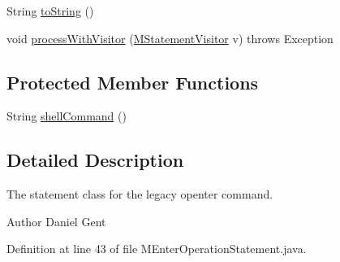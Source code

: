 \begin{DoxyCompactItemize}
\item 
String \hyperlink{classorg_1_1tzi_1_1use_1_1uml_1_1sys_1_1soil_1_1_m_enter_operation_statement_a910c261b37e96e4fa86263235ef70ded}{to\-String} ()
\item 
void \hyperlink{classorg_1_1tzi_1_1use_1_1uml_1_1sys_1_1soil_1_1_m_enter_operation_statement_a3bdb19955b266353825c7620027998f5}{process\-With\-Visitor} (\hyperlink{interfaceorg_1_1tzi_1_1use_1_1uml_1_1sys_1_1soil_1_1_m_statement_visitor}{M\-Statement\-Visitor} v)  throws Exception 
\end{DoxyCompactItemize}
\subsection*{Protected Member Functions}
\begin{DoxyCompactItemize}
\item 
String \hyperlink{classorg_1_1tzi_1_1use_1_1uml_1_1sys_1_1soil_1_1_m_enter_operation_statement_a7ce06319cb0721187f102c543ecb492f}{shell\-Command} ()
\end{DoxyCompactItemize}


\subsection{Detailed Description}
The statement class for the legacy openter command. \begin{DoxyAuthor}{Author}
Daniel Gent 
\end{DoxyAuthor}


Definition at line 43 of file M\-Enter\-Operation\-Statement.\-java.



